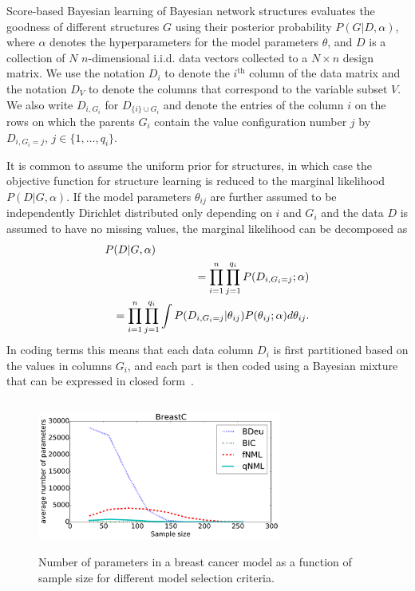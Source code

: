 Score-based Bayesian learning of Bayesian network structures evaluates the goodness of different structures $G$ using their
posterior probability $P(G|D,\alpha)$, where $\alpha$ denotes the
hyperparameters for the model parameters $\theta$, and $D$ is a
collection of $N$ $n$\nobreakdash-dimensional i.i.d. data vectors
collected to a $N\times n$ design matrix. We use the notation $D_i$ to
denote the $i^\text{th}$ column of the data matrix and the notation $D_V$ to denote
the columns that correspond to the variable subset $V$. We also write
$D_{i,G_i}$ for $D_{\{i\}\cup G_i}$ and denote the entries of the
column $i$ on the rows on which the parents $G_i$ contain the value
configuration number $j$ by $D_{i,G_i=j}$, $j\in\{1,\ldots,q_i\}$.

It is common to assume the uniform prior for structures, in which case
the objective function for structure learning is reduced to the
marginal likelihood $P(D|G,\alpha)$.  If the model parameters
$\theta_{ij}$ are further assumed to be independently Dirichlet
distributed only depending on $i$ and $G_{i}$ and the data $D$ is
assumed to have no missing values, the marginal likelihood can be
decomposed as
\begin{eqnarray}
\label{eqn:bayesmix}
\lefteqn{P(D|G,\alpha)}\nonumber\\
&&=\prod_{i=1}^{n}\prod_{j=1}^{q_i}P(D_{i,G_i=j};\alpha)\nonumber\\
&&=\prod_{i=1}^{n}\prod_{j=1}^{q_i}\int P(D_{i,G_i=j}|\theta_{ij})P(\theta_{ij};\alpha) d\theta_{ij}.
\end{eqnarray}
In coding terms this means that each data column $D_i$ is first
partitioned based on the values in columns $G_i$, and each part is
then coded using a Bayesian mixture that can be expressed in closed
form~\cite{Bunt91, Heck95}. 

\begin{figure}
\centering
\includegraphics[width=8cm,height=5cm]{qNML_images/breast_cancer_npmean.pdf}
\caption{Number of parameters in a breast cancer model as a function
  of sample size for different model selection criteria.}
\label{fig:bcnpmean}
\end{figure}


